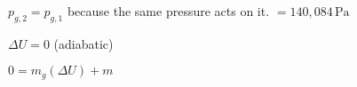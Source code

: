 \( p_{g,2} = p_{g,1} \) because the same pressure acts on it.  
\( = 140,084 \, \text{Pa} \)  

\( \Delta U = 0 \) (adiabatic)  

\( 0 = m_g (\Delta U) + m \)